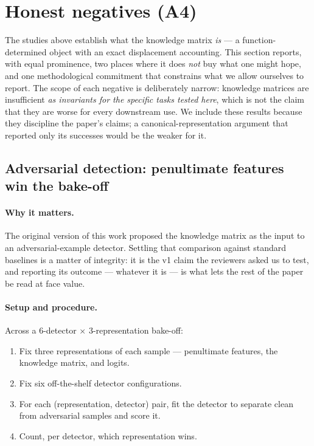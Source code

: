 \section{Honest negatives (A4)}
\label{sec:study3}
\label{sec:A4}

The studies above establish what the knowledge matrix \emph{is} --- a
function-determined object with an exact displacement accounting. This
section reports, with equal prominence, two places where it does
\emph{not} buy what one might hope, and one methodological commitment that
constrains what we allow ourselves to report. The scope of each negative is
deliberately narrow: knowledge matrices are insufficient \emph{as
invariants for the specific tasks tested here}, which is not the claim
that they are worse for every downstream use. We include these results
because they discipline the paper's claims; a canonical-representation
argument that reported only its successes would be the weaker for it.

\subsection{Adversarial detection: penultimate features win the bake-off}
\label{sec:study3-bakeoff}

\paragraph{Why it matters.}
The original version of this work proposed the knowledge matrix as the
input to an adversarial-example detector. Settling that comparison against
standard baselines is a matter of integrity: it is the v1 claim the
reviewers asked us to test, and reporting its outcome --- whatever it is
--- is what lets the rest of the paper be read at face value.

\paragraph{Setup and procedure.}
Across a $6$-detector $\times$ $3$-representation bake-off:
\begin{enumerate}
\item Fix three representations of each sample --- penultimate features,
the knowledge matrix, and logits.
\item Fix six off-the-shelf detector configurations.
\item For each (representation, detector) pair, fit the detector to
separate clean from adversarial samples and score it.
\item Count, per detector, which representation wins.
\end{enumerate}

